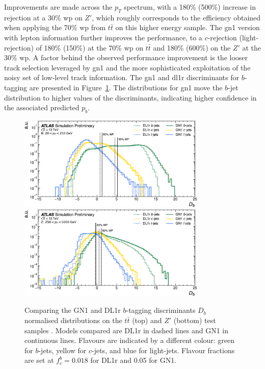 Improvements are made across the  $p_T$ spectrum, with a 180\% (500\%) increase in rejection at a 30\% \gls{wp} on $Z'$, which roughly corresponds to the efficiency obtained when applying the 70\% \gls{wp} from $t\bar{t}$ on this higher energy sample. The \gls{gn1} version with lepton information further improves the performance, to a $c$-rejection (light-rejection) of 180\% (150\%) at the 70\% \gls{wp} on $t\bar{t}$ and 180\% (600\%) on the $Z'$ at the 30\% \gls{wp}. A factor behind the observed performance improvement is the looser track selection leveraged by \gls{gn1} and the more sophisticated exploitation of the noisy set of low-level track information. The \gls{gn1} and \gls{dl1r} discriminants for $b$-tagging are presented in Figure~\ref{fig:GN1disb}. The distributions for \gls{gn1} move the $b$-jet distribution to higher values of the discriminants, indicating higher confidence in the associated predicted $p_b$. 

\newpage
\begin{figure}[h!]
  \centering
  \includegraphics[width=0.8\textwidth]{Images/FTAG/GN/GN1/eff/ttb.png}
  \includegraphics[width=0.8\textwidth]{Images/FTAG/GN/GN1/eff/zpb.png}
  \caption{Comparing the GN1 and DL1r $b$-tagging discriminants $D_b$ normalised distributions on the $t\bar{t}$ (top) and $Z'$ (bottom) test samples \cite{ATL-PHYS-PUB-2022-027}. Models compared are DL1r in dashed lines and GN1 in continuous lines. Flavours are indicated by a different colour: green for $b$-jets, yellow for $c$-jets, and blue for light-jets. Flavour fractions are set at $f^b_c = 0.018$ for DL1r and 0.05 for GN1.}
  \label{fig:GN1disb}
\end{figure} 

